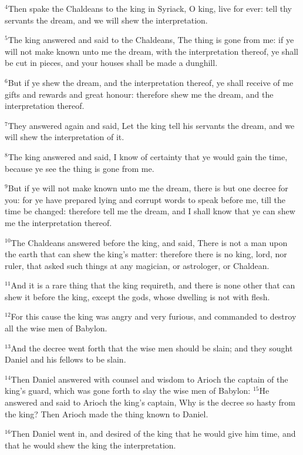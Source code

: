 \documentclass[12pt]{article}
\begin{document}
$^{4}$Then spake the Chaldeans to the king in Syriack, O king, live for
ever: tell thy servants the dream, and we will shew the
interpretation.


$^{5}$The king answered and said to the Chaldeans, The thing is gone
from me: if ye will not make known unto me the dream, with the
interpretation thereof, ye shall be cut in pieces, and your houses
shall be made a dunghill.


$^{6}$But if ye shew the dream, and the interpretation thereof, ye shall
receive of me gifts and rewards and great honour: therefore shew me
the dream, and the interpretation thereof.


$^{7}$They answered again and said, Let the king tell his servants the
dream, and we will shew the interpretation of it.


$^{8}$The king answered and said, I know of certainty that ye would gain
the time, because ye see the thing is gone from me.


$^{9}$But if ye will not make known unto me the dream, there is but one
decree for you: for ye have prepared lying and corrupt words to speak
before me, till the time be changed: therefore tell me the dream, and
I shall know that ye can shew me the interpretation thereof.


$^{10}$The Chaldeans answered before the king, and said, There is not a
man upon the earth that can shew the king's matter: therefore there is
no king, lord, nor ruler, that asked such things at any magician, or
astrologer, or Chaldean.


$^{11}$And it is a rare thing that the king requireth, and there is none
other that can shew it before the king, except the gods, whose
dwelling is not with flesh.


$^{12}$For this cause the king was angry and very furious, and commanded
to destroy all the wise men of Babylon.


$^{13}$And the decree went forth that the wise men should be slain; and
they sought Daniel and his fellows to be slain.


$^{14}$Then Daniel answered with counsel and wisdom to Arioch the
captain of the king's guard, which was gone forth to slay the wise men
of Babylon: $^{15}$He answered and said to Arioch the king's captain,
Why is the decree so hasty from the king? Then Arioch made the thing
known to Daniel.


$^{16}$Then Daniel went in, and desired of the king that he would give
him time, and that he would shew the king the interpretation.
\end{document}
